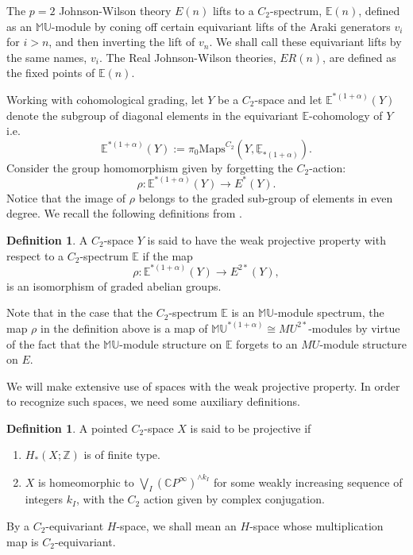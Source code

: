 \documentclass[12pt]{amsart}
\numberwithin{equation}{section}
\theoremstyle{plain}  %
\theoremstyle{definition}  %
\newtheorem{defn}[equation]{Definition}
\newcommand{\ZZ}{\mathbb{Z}}
\newcommand{\ER}{\mathbb{E}}
\newcommand{\cp}{\mathbb{C}P^\infty}
\newcommand{\Maps}{\text{Maps}}
\newcommand{\MU}{\mathbb {MU}}
\newcommand{\E}{\mathbb{E}}
\begin{document}
\medskip
\noindent
The $p=2$ Johnson-Wilson theory $E(n)$
lifts to a $C_2$-spectrum, $\E(n)$, defined as an $\MU$-module by coning off certain equivariant lifts of the Araki generators $v_i$ for $i > n$, and then inverting the lift of $v_n$. We shall call these equivariant lifts by the same names, $v_i$. The Real Johnson-Wilson theories, $ER(n)$, are defined as the fixed points of $\E(n)$.
\medskip
\noindent

Working with cohomological grading, let $Y$ be a $C_2$-space and let $\ER^{\ast(1+\alpha)}(Y)$ denote the subgroup of diagonal elements in the equivariant $\ER$-cohomology of $Y$ i.e. 
$$\ER^{\ast(1+\alpha)}(Y) := \pi_0\Maps^{C_2}(Y,\underline{\ER}_{\ast(1+\alpha)}).$$
 Consider the group homomorphism given by forgetting the $C_2$-action: 
\[ \rho : \ER^{\ast(1+\alpha)}(Y) \longrightarrow E^{\ast}(Y). \]
Notice that the image of $\rho$ belongs to the graded sub-group of elements in even degree. We recall the following definitions from \cite{KW07b}.

\medskip
\begin{defn} A $C_2$-space $Y$ is said to have the weak projective property with respect to a $C_2$-spectrum $\ER$ if the map
\[ \rho : \ER^{\ast(1+\alpha)}(Y) \longrightarrow E^{2\ast}(Y), \]
is an isomorphism of graded abelian groups.
\end{defn}

Note that in the case that the $C_2$-spectrum $\E$ is an $\MU$-module spectrum, the map $\rho$ in the definition above is a map of $\MU^{*(1+\alpha)}\cong MU^{2*}$-modules by virtue of the fact that the $\MU$-module structure on $\E$ forgets to an $MU$-module structure on $E$.

We will make extensive use of spaces with the weak projective property. In order to recognize such spaces, we need some auxiliary definitions.

\medskip
\begin{defn} A pointed $C_2$-space $X$ is said to be projective if 
\begin{enumerate}
\item $H_*(X; \ZZ)$ is of finite type. 
\item $X$ is homeomorphic to $\bigvee_I ({\cp})^{\wedge k_I}$ 
for some weakly increasing sequence of integers $k_I$, 
with the $C_2$ action given by complex conjugation. 
\end{enumerate}
\end{defn}

\medskip
\noindent
By a $C_2$-equivariant $H$-space, we shall mean an $H$-space whose multiplication map is $C_2$-equivariant.
\end{document}
